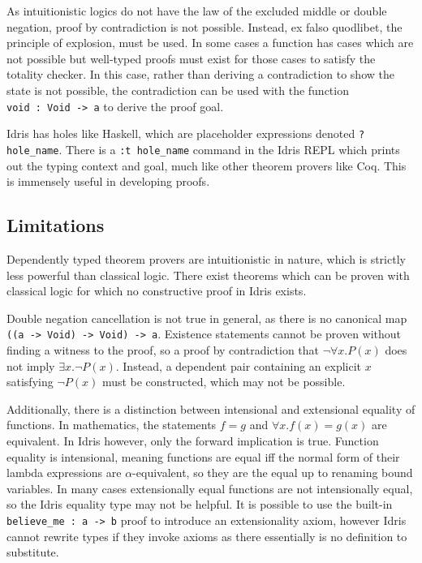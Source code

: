 \documentclass[]{report}
\begin{document}
As intuitionistic logics do not have the law of the excluded middle or double negation, proof by contradiction is not possible. Instead, ex falso quodlibet, the principle of explosion, must be used. In some cases a function has cases which are not possible but well-typed proofs must exist for those cases to satisfy the totality checker. In this case, rather than deriving a contradiction to show the state is not possible, the contradiction can be used with the function \texttt{void\ :\ Void\ ->\ a} to derive the proof goal.

Idris has holes like Haskell, which are placeholder expressions denoted \texttt{?hole\_name}. There is a \texttt{:t hole\_name} command in the Idris REPL which prints out the typing context and goal, much like other theorem provers like Coq. This is immensely useful in developing proofs.

\subsection{Limitations}

Dependently typed theorem provers are intuitionistic in nature, which is strictly less powerful than classical logic. There exist theorems which can be proven with classical logic for which no constructive proof in Idris exists.

Double negation cancellation is not true in general, as there is no canonical map \texttt{((a\ ->\ Void)\ ->\ Void)\ ->\ a}. Existence statements cannot be proven without finding a witness to the proof, so a proof by contradiction that $\neg\forall x.P(x)$ does not imply $\exists x.\neg P(x)$. Instead, a dependent pair containing an explicit $x$ satisfying $\neg P(x)$ must be constructed, which may not be possible.

Additionally, there is a distinction between intensional and extensional equality of functions. In mathematics, the statements $f=g$ and $\forall x. f(x)=g(x)$ are equivalent. In Idris however, only the forward implication is true. Function equality is intensional, meaning functions are equal iff the normal form of their lambda expressions are $\alpha$-equivalent, so they are the equal up to renaming bound variables. In many cases extensionally equal functions are not intensionally equal, so the Idris equality type may not be helpful. It is possible to use the built-in \texttt{believe\_me\ :\ a\ ->\ b} proof to introduce an extensionality axiom, however Idris cannot rewrite types if they invoke axioms as there essentially is no definition to substitute.
\end{document}
